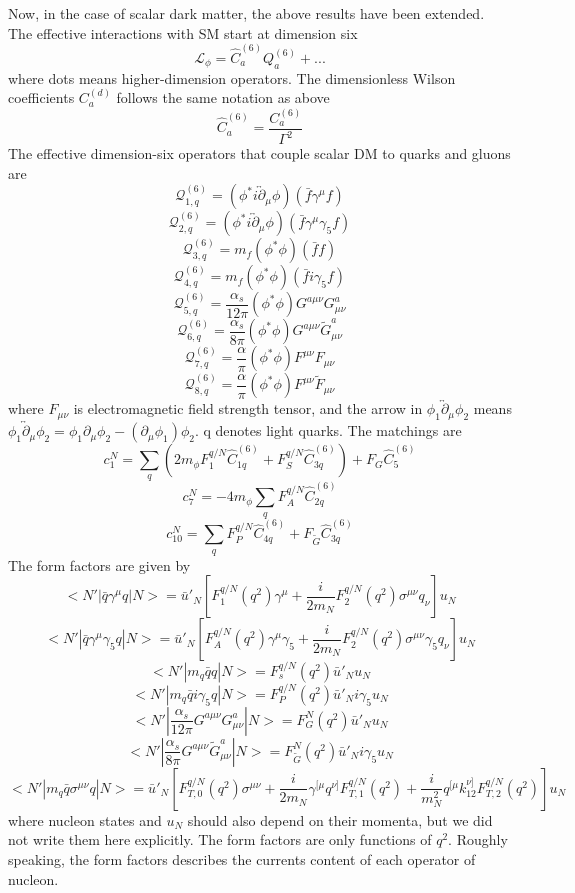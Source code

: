 \documentclass[12pt]{article}
\begin{document}
Now, in the case of scalar dark matter, the above results have been extended. The effective interactions with SM start at dimension six 
$$
\mathcal L_\phi = \hat C_a^{(6)} Q_a^{(6)} + ... 
$$
where dots means higher-dimension operators. The dimensionless Wilson coefficients $C_a^{(d)} $ follows the same notation as above
$$
\hat C_a^{(6)} = \frac{C_a^{(6)}}{\Gamma^2}
$$
The effective dimension-six operators that couple scalar DM to quarks and gluons are 
$$
\mathcal Q_{1,q}^{(6)} = (\phi^* i \overleftrightarrow\partial_\mu \phi ) ( \bar f \gamma^\mu f ) 
$$
$$
\mathcal Q_{2,q}^{(6)} = (\phi^* i \overleftrightarrow\partial_\mu \phi ) ( \bar f \gamma^\mu \gamma_5 f ) 
$$
$$
\mathcal Q_{3,q}^{(6)} = m_f (\phi^*  \phi ) ( \bar f  f ) 
$$
$$
\mathcal Q_{4,q}^{(6)} = m_f (\phi^*  \phi ) ( \bar f i\gamma_5 f ) 
$$
$$
\mathcal Q_{5,q}^{(6)} = \frac{\alpha_s}{12 \pi} (\phi^*  \phi ) G^{a\mu\nu}G_{\mu\nu}^a
$$
$$
\mathcal Q_{6,q}^{(6)} = \frac{\alpha_s}{8 \pi} (\phi^*  \phi ) G^{a\mu\nu}\tilde G_{\mu\nu}^a
$$
$$
\mathcal Q_{7,q}^{(6)} = \frac{\alpha}{ \pi} (\phi^*  \phi ) F^{\mu\nu} F_{\mu\nu}
$$
$$
\mathcal Q_{8,q}^{(6)} = \frac{\alpha}{ \pi} (\phi^*  \phi ) F^{\mu\nu}\tilde F_{\mu\nu}
$$
where $F_{\mu\nu}$ is electromagnetic field strength tensor, and the arrow in $\phi_1 \overleftrightarrow\partial_\mu \phi_2$ means $\phi_1 \overleftrightarrow\partial_\mu \phi_2 = \phi_1 \partial_\mu \phi_2 - (\partial_\mu \phi_1) \phi_2 $. q denotes light quarks. 
The matchings are
$$
c_1^N  = \sum_q ( 2 m_\phi F_1^{q/N} \hat C_{1q}^{(6)} +F_S ^{q/N} \hat C_{3q}^{(6)} ) + F_G \hat C_5 ^{(6)}
$$
$$
c_7^N  = -4  m_\phi \sum_q  F_A^{q/N} \hat C_{2q}^{(6)} 
$$
$$
c_{10}^N  = \sum_q  F_P^{q/N} \hat C_{4q}^{(6)} +F_{\tilde G} \hat C_{3q}^{(6)}
$$
The form factors are given by 
$$
<N'|\bar q \gamma^\mu q|N> = \bar u'_N [ F_1^{q/N}(q^2) \gamma^\mu + \frac{i}{2m_N} F_2^{q/N}(q^2) \sigma^{\mu\nu} q_\nu] u_N
$$
$$
<N'|\bar q \gamma^\mu \gamma_5 q|N> = \bar u'_N [ F_A^{q/N}(q^2) \gamma^\mu \gamma_5 + \frac{i}{2m_N} F_2^{q/N}(q^2) \sigma^{\mu\nu} \gamma_5 q_\nu] u_N
$$
$$
<N'| m_q \bar q q|N> = F_s^{q/N}(q^2)\bar u'_N  u_N
$$
$$
<N'| m_q \bar q i \gamma_5 q|N> = F_P^{q/N}(q^2)\bar u'_N i \gamma_5 u_N
$$
$$
<N'| \frac{\alpha_s }{12 \pi } G^{a\mu \nu } G_{\mu\nu }^{a} |N> = F_G^{N}(q^2)\bar u'_N  u_N
$$
$$
<N'| \frac{\alpha_s }{8 \pi } G^{a\mu \nu } \tilde G_{\mu\nu }^{a} |N> = F_{\tilde G} ^{N}(q^2)\bar u'_N  i \gamma_5 u_N
$$
$$
<N'|m_q \bar q \sigma^{\mu\nu} q|N> = \bar u'_N [F_{T,0}^{q/N}(q^2) \sigma^{\mu \nu } + \frac{i}{2m_N} \gamma^{ [\mu} q^{ \nu ] } F_{T,1}^{q/N} (q^2) +
\frac{i}{m_N^2} q^{ [ \mu}k_{12}^{\nu ]} F_{T,2}^{q/N} (q^2) ] u_N
$$
where nucleon states and $u_N$ should also depend on their momenta, but we did not write them here explicitly. The form factors are only functions of $q^2$. 
Roughly speaking, the form factors describes the currents content of each operator of nucleon. 
\end{document}
